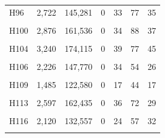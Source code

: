 \documentclass[
  a4paper,
  titlepage]{article}
\begin{document}
\begin{longtable}[t]{lllllll}
H96 & 2,722 & 145,281 & 0 & 33 & 77 & 35\\
 
\cellcolor{gray!6}{H97} & \cellcolor{gray!6}{1,448} & \cellcolor{gray!6}{116,480} & \cellcolor{gray!6}{0} & \cellcolor{gray!6}{19} & \cellcolor{gray!6}{39} & \cellcolor{gray!6}{24}\\
 
H100 & 2,876 & 161,536 & 0 & 34 & 88 & 37\\
 
\cellcolor{gray!6}{H102} & \cellcolor{gray!6}{2,544} & \cellcolor{gray!6}{151,090} & \cellcolor{gray!6}{0} & \cellcolor{gray!6}{33} & \cellcolor{gray!6}{69} & \cellcolor{gray!6}{34}\\
 
H104 & 3,240 & 174,115 & 0 & 39 & 77 & 45\\
 
\cellcolor{gray!6}{H105} & \cellcolor{gray!6}{1,578} & \cellcolor{gray!6}{101,415} & \cellcolor{gray!6}{0} & \cellcolor{gray!6}{26} & \cellcolor{gray!6}{55} & \cellcolor{gray!6}{18}\\
 
H106 & 2,226 & 147,770 & 0 & 34 & 54 & 26\\
 
\cellcolor{gray!6}{H108} & \cellcolor{gray!6}{1,842} & \cellcolor{gray!6}{118,106} & \cellcolor{gray!6}{0} & \cellcolor{gray!6}{21} & \cellcolor{gray!6}{48} & \cellcolor{gray!6}{21}\\
 
H109 & 1,485 & 122,580 & 0 & 17 & 44 & 17\\
 
\cellcolor{gray!6}{H112} & \cellcolor{gray!6}{2,579} & \cellcolor{gray!6}{159,045} & \cellcolor{gray!6}{0} & \cellcolor{gray!6}{33} & \cellcolor{gray!6}{87} & \cellcolor{gray!6}{30}\\
 
H113 & 2,597 & 162,435 & 0 & 36 & 72 & 29\\
 
\cellcolor{gray!6}{H115} & \cellcolor{gray!6}{3,624} & \cellcolor{gray!6}{199,410} & \cellcolor{gray!6}{0} & \cellcolor{gray!6}{48} & \cellcolor{gray!6}{98} & \cellcolor{gray!6}{41}\\
 
H116 & 2,120 & 132,557 & 0 & 24 & 57 & 32\\
 
\cellcolor{gray!6}{H117} & \cellcolor{gray!6}{3,127} & \cellcolor{gray!6}{161,841} & \cellcolor{gray!6}{0} & \cellcolor{gray!6}{36} & \cellcolor{gray!6}{86} & \cellcolor{gray!6}{42}\\
 

\end{longtable}
\end{document}

